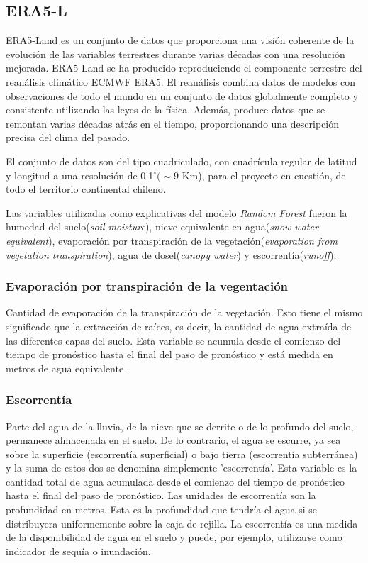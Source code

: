    \subsection{ERA5-L}
    ERA5-Land es un conjunto de datos que proporciona una visión coherente de la evolución de las variables terrestres durante varias décadas 
    con una resolución mejorada. ERA5-Land se ha producido reproduciendo el componente terrestre del reanálisis climático ECMWF ERA5. El reanálisis combina 
    datos de modelos con observaciones de todo el mundo en un conjunto de datos globalmente completo y consistente utilizando las leyes de la física. 
    Además, produce datos que se remontan varias décadas atrás en el tiempo, proporcionando una descripción precisa del clima del pasado\cite{ERA5-L}.

    El conjunto de datos son del tipo cuadriculado, con cuadrícula regular de latitud y longitud a una resolución de 0.1$^{\circ}(\sim 9$ Km), 
    para el proyecto en cuestión, de todo el territorio continental chileno.

    Las variables utilizadas como explicativas del modelo \textit{Random Forest} fueron la humedad del suelo(\textit{soil moisture}), nieve equivalente en agua(\textit{snow water equivalent}),
    evaporación por transpiración de la vegetación(\textit{evaporation from vegetation transpiration}), agua de dosel(\textit{canopy water}) y escorrentía(\textit{runoff}).
    
    \subsubsection{Evaporación por transpiración de la vegentación}
    Cantidad de evaporación de la transpiración de la vegetación. Esto tiene el mismo significado que la extracción de raíces, 
    es decir, la cantidad de agua extraída de las diferentes capas del suelo. 
    Esta variable se acumula desde el comienzo del tiempo de pronóstico hasta el final del paso de pronóstico y está medida en metros de agua equivalente \cite{ERA5-L}.

    \subsubsection{Escorrentía}
    Parte del agua de la lluvia, de la nieve que se derrite o de lo profundo del suelo, permanece almacenada en el suelo. De lo contrario, el agua se escurre, ya sea sobre la superficie (escorrentía superficial)
    o bajo tierra (escorrentía subterránea) y la suma de estos dos se denomina simplemente 'escorrentía'. Esta variable es la cantidad total de agua acumulada desde el comienzo del tiempo de pronóstico hasta el 
    final del paso de pronóstico. Las unidades de escorrentía son la profundidad en metros. Esta es la profundidad que tendría el agua si se distribuyera uniformemente sobre la caja de rejilla.
    La escorrentía es una medida de la disponibilidad de agua en el suelo y puede, por ejemplo, utilizarse como indicador de sequía o inundación.


